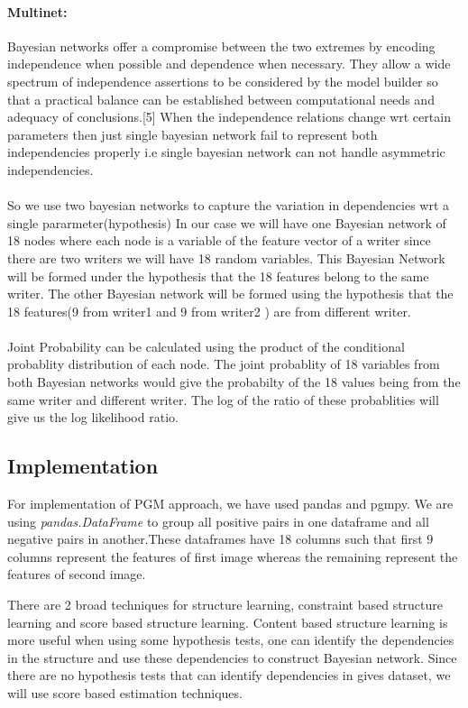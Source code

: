 \documentclass{article}
\begin{document}
    \paragraph{Multinet:\\}
    Bayesian networks offer a compromise between the two
    extremes by encoding independence when possible and
    dependence when necessary. They allow a wide spectrum
    of independence assertions to be considered by
    the model builder so that a practical balance can be established
    between computational needs and adequacy
    of conclusions.[5] When the independence relations change wrt certain parameters then just single bayesian network fail to represent both independencies properly i.e single bayesian network can not handle asymmetric  independencies.\\\\
    So we use two bayesian networks to capture the variation in dependencies wrt a single pararmeter(hypothesis)
    In our case we will have one Bayesian network of 18 nodes where each node is a variable of the feature vector of a writer since there are two writers we will have 18 random variables. This Bayesian Network will be formed under the hypothesis that the 18 features belong to the same writer.
    The other Bayesian network will be formed using the hypothesis that the 18 features(9 from writer1 and 9 from writer2 ) are from different writer.\\\\
    Joint Probability can be calculated using the product of the conditional probablity distribution of each node.
    The joint probablity of 18 variables from both Bayesian networks would give the probabilty of the 18 values being from the same writer and different writer. The log of the ratio of these probablities will give us the log likelihood ratio.
\subsection{Implementation}
    For implementation of PGM approach, we have used pandas and pgmpy. We are using \textit{pandas.DataFrame} to group all positive pairs in one dataframe and all negative pairs in another.These dataframes have 18 columns such that first 9 columns represent the features of first image whereas the remaining represent the features of second  image.
    
    There are 2 broad techniques for structure learning, constraint based structure learning and score based structure learning. Content based structure learning is more useful when using some hypothesis tests, one can identify the dependencies in the structure and use these dependencies to construct Bayesian network. Since there are no hypothesis tests that can identify dependencies in gives dataset, we will use score based estimation techniques.
    
\end{document}
